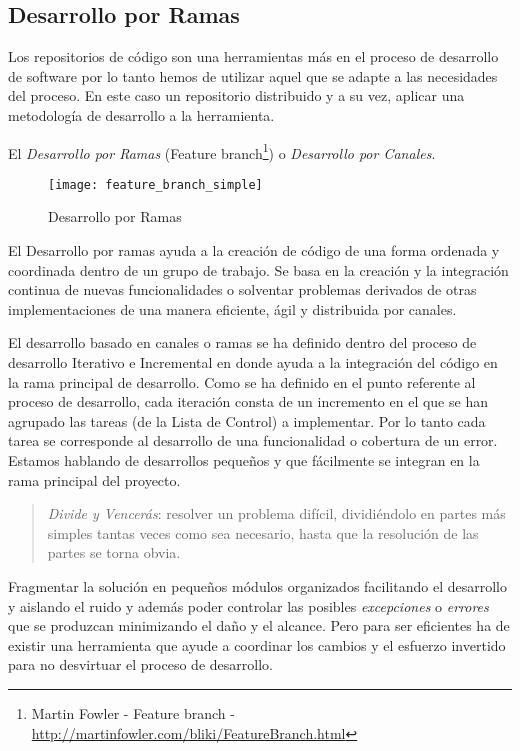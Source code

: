 \subsection{Desarrollo por Ramas}
\label{sub:desarrollo-ramas}

\par Los repositorios de código son una herramientas más en el proceso de desarrollo de software por lo tanto hemos de utilizar aquel que se adapte a las necesidades del proceso. En este caso un repositorio distribuido y a su vez, aplicar una metodología de desarrollo a la herramienta.

\par El \emph{Desarrollo por Ramas} (Feature branch\footnote{Martin Fowler - Feature branch - \url{http://martinfowler.com/bliki/FeatureBranch.html}}) o \emph{Desarrollo por Canales}.

\begin{figure}[H]
    \centering
    \texttt{[image: feature\_branch\_simple]}
    \caption{Desarrollo por Ramas}
    \label{fig:feature_branch_simple}
\end{figure}

\par El Desarrollo por ramas ayuda a la creación de código de una forma ordenada y coordinada dentro de un grupo de trabajo. Se basa en la creación y la integración continua de nuevas funcionalidades o solventar problemas derivados de otras implementaciones de una manera eficiente, ágil y distribuida por canales.

\par El desarrollo basado en canales o ramas se ha definido dentro del proceso de desarrollo Iterativo e Incremental en donde ayuda a la integración del código en la rama principal de desarrollo. Como se ha definido en el punto referente al proceso de desarrollo, cada iteración consta de un incremento en el que se han agrupado las tareas (de la Lista de Control) a implementar. Por lo tanto cada tarea se corresponde al desarrollo de una funcionalidad o cobertura de un error. Estamos hablando de desarrollos pequeños y que fácilmente se integran en la rama principal del proyecto.

\begin{quote}
    \emph{Divide y Vencerás}: resolver un problema difícil, dividiéndolo en partes más simples tantas veces como sea necesario, hasta que la resolución de las partes se torna obvia.
\end{quote}

\par Fragmentar la solución en pequeños módulos organizados facilitando el desarrollo y aislando el ruido y además poder controlar las posibles \emph{excepciones} o \emph{errores} que se produzcan minimizando el daño y el alcance. Pero para ser eficientes ha de existir una herramienta que ayude a coordinar los cambios y el esfuerzo invertido para no desvirtuar el proceso de desarrollo.

